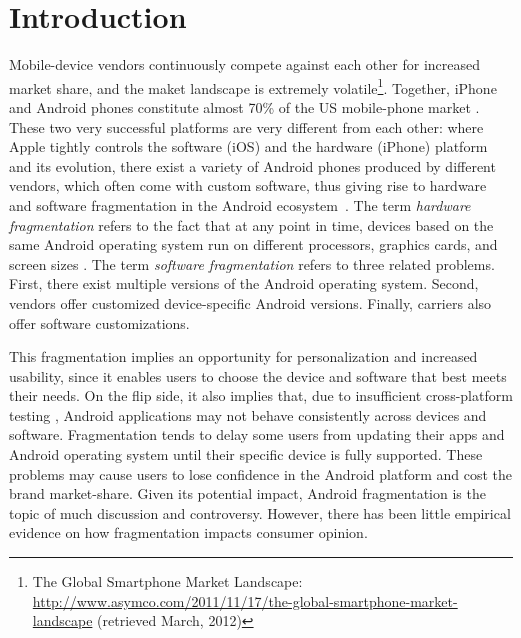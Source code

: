 \documentclass[10pt, conference, compsocconf]{IEEEtran}
\begin{document}
\section{Introduction}

Mobile-device vendors continuously compete against each other for
increased market share, and the maket landscape is extremely
volatile\footnote{The Global Smartphone Market Landscape:
  \url{http://www.asymco.com/2011/11/17/the-global-smartphone-market-landscape}
  (retrieved March, 2012)}. Together, iPhone and Android phones
constitute almost 70\% of the US mobile-phone market
\cite{usmarket}. These two very successful platforms are very
different from each other: where Apple tightly controls the software
(iOS) and the hardware (iPhone) platform and its evolution, there
exist a variety of Android phones produced by different vendors, which
often come with custom software, thus giving rise to hardware and
software fragmentation in the Android ecosystem~\cite{analysis}. The
term {\em hardware fragmentation} refers to the fact that at any point
in time, devices based on the same Android operating system run on
different processors, graphics cards, and screen sizes
\cite{analysis}. The term {\em software fragmentation} refers to three
related problems. First, there exist multiple versions of the Android
operating system. Second, vendors offer customized device-specific
Android versions. Finally, carriers also offer software
customizations.

This fragmentation implies an opportunity for personalization and
increased usability, since it enables users to choose the device and
software that best meets their needs. On the flip side, it also
implies that, due to insufficient cross-platform
testing \cite{testing}, Android applications may not behave
consistently across devices and software.  
Fragmentation tends to delay some users from updating their apps
and Android operating system until their specific device is fully supported.
These problems
may cause users to lose confidence in the Android platform and cost
the brand market-share. Given its potential impact, Android
fragmentation is the topic of much discussion and
controversy. However, there has been little empirical evidence on how
fragmentation impacts consumer opinion.
\end{document}
